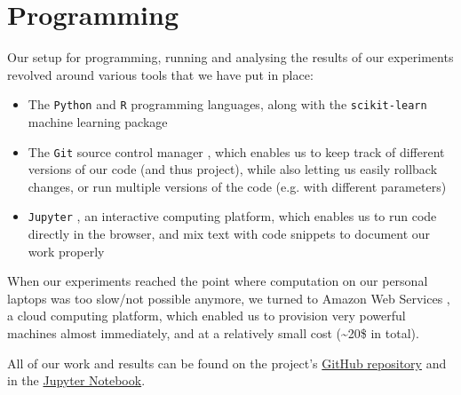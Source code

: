 \section{Programming}
Our setup for programming, running and analysing the results of our experiments revolved around various tools that we have put in place:
\begin{itemize}
    \item The \texttt{Python} and \texttt{R} programming languages, along with the \texttt{scikit-learn} machine learning package \cite{python}\cite{R}\cite{learn}
    \item The \texttt{Git} source control manager \cite{git}, which enables us to keep track of different versions of our code (and thus project), while also letting us easily rollback changes, or run multiple versions of the code (e.g. with different parameters)
    \item \texttt{Jupyter} \cite{jupyter}, an interactive computing platform, which enables us to run code directly in the browser, and mix text with code snippets to document our work properly
\end{itemize}

When our experiments reached the point where computation on our personal laptops was too slow/not possible anymore, we turned to Amazon Web Services \cite{aws}, a cloud computing platform, which enabled us to provision very powerful machines almost immediately, and at a relatively small cost (\textasciitilde20\$ in total).

All of our work and results can be found on the project's \href{https://github.com/ncocacola/econml/}{GitHub repository} and in the
\href{https://github.com/ncocacola/econml/blob/master/econml.ipynb}{Jupyter Notebook}.
